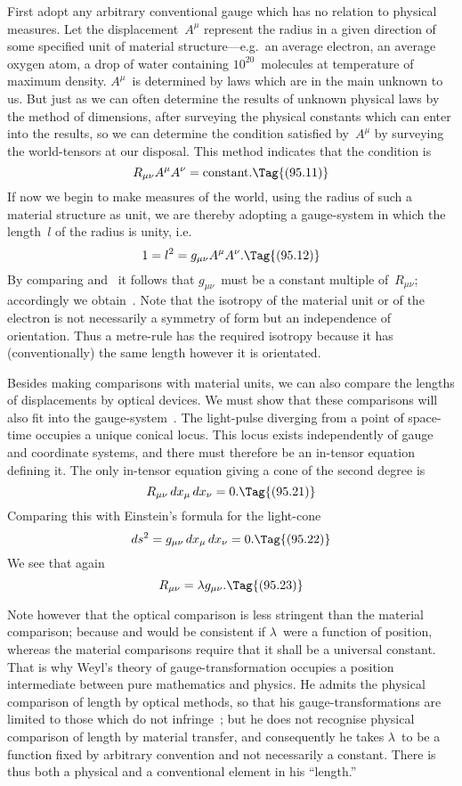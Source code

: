 \documentclass[12pt]{book}
\begin{document}
First adopt any arbitrary conventional gauge which has no relation to
%
%
physical measures. Let the displacement~$A^{\mu}$ represent the radius in a given
direction of some specified unit of material structure---e.g.\ an average electron,
an average oxygen atom, a drop of water containing $10^{20}$~molecules at temperature
of maximum density. $A^{\mu}$~is determined by laws which are in the main
unknown to us. But just as we can often determine the results of unknown
physical laws by the method of dimensions, after surveying the physical
constants which can enter into the results, so we can determine the condition
satisfied by~$A^{\mu}$ by surveying the world\hyp{}tensors at our disposal. This method
indicates that the condition is
\[
R_{\mu\nu} A^{\mu} A^{\nu} = \text{constant}.
\Tag{(95.11)}
\]
If now we begin to make measures of the world, using the radius of such a
material structure as unit, we are thereby adopting a gauge\hyp{}system in which
the length~$l$ of the radius is unity, i.e.\
\[
1 = l^{2} = g_{\mu\nu} A^{\mu} A^{\nu}.
\Tag{(95.12)}
\]
By comparing  and~ it follows that $g_{\mu\nu}$~must be a constant
multiple of~$R_{\mu\nu}$; accordingly we obtain~\Eq{(95.1)}\footnotemark.\footnotetext
  {Note that the isotropy of the material unit or of the electron is not necessarily a symmetry
  of form but an independence of orientation. Thus a metre\hyp{}rule has the required isotropy because
  it has (conventionally) the same length however it is orientated.}

Besides making comparisons with material units, we can also compare the
lengths of displacements by optical devices. We must show that these comparisons
will also fit into the gauge\hyp{}system~\Eq{(95.1)}. The light\hyp{}pulse diverging
\index{Light\hyp{}pulse!in\hyp{}invariant equation}%
from a point of space\hyp{}time occupies a unique conical locus. This locus exists
independently of gauge and coordinate systems, and there must therefore be
an in\hyp{}tensor equation defining it. The only in\hyp{}tensor equation giving a cone
of the second degree is
\[
R_{\mu\nu}\, dx_{\mu}\, dx_{\nu} = 0.
\Tag{(95.21)}
\]
Comparing this with Einstein's formula for the light\hyp{}cone
\[
ds^{2} = g_{\mu\nu}\, dx_{\mu}\, dx_{\nu} = 0.
\Tag{(95.22)}
\]
We see that again
\[
R_{\mu\nu} = \lambda g_{\mu\nu}.
\Tag{(95.23)}
\]

Note however that the optical comparison is less stringent than the
material comparison; because \Eq{(95.21)} and \Eq{(95.22)} would be consistent if $\lambda$~were
a function of position, whereas the material comparisons require that it
shall be a universal constant. That is why Weyl's theory of gauge\hyp{}transformation
occupies a position intermediate between pure mathematics and physics.
He admits the physical comparison of length by optical methods, so that his
gauge\hyp{}transformations are limited to those which do not infringe~; but
he does not recognise physical comparison of length by material transfer, and
consequently he takes $\lambda$~to be a function fixed by arbitrary convention and
not necessarily a constant. There is thus both a physical and a conventional
element in his ``length.''
\end{document}
